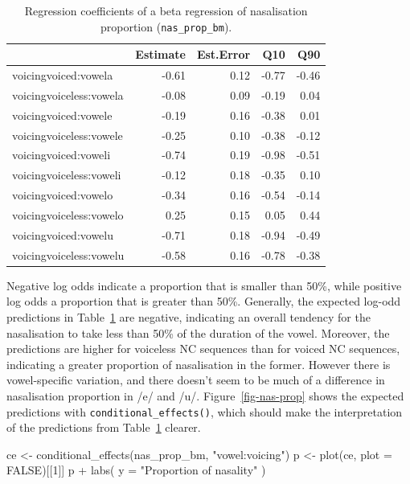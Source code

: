 \documentclass[
  authoryear,
  preprint,
  3p]{elsarticle}
\newenvironment{Shaded}{\begin{snugshade}}{\end{snugshade}}
\newcommand{\AttributeTok}[1]{\textcolor[rgb]{0.40,0.45,0.13}{#1}}
\newcommand{\ConstantTok}[1]{\textcolor[rgb]{0.56,0.35,0.01}{#1}}
\newcommand{\DecValTok}[1]{\textcolor[rgb]{0.68,0.00,0.00}{#1}}
\newcommand{\FunctionTok}[1]{\textcolor[rgb]{0.28,0.35,0.67}{#1}}
\newcommand{\NormalTok}[1]{\textcolor[rgb]{0.00,0.23,0.31}{#1}}
\newcommand{\OtherTok}[1]{\textcolor[rgb]{0.00,0.23,0.31}{#1}}
\newcommand{\SpecialCharTok}[1]{\textcolor[rgb]{0.37,0.37,0.37}{#1}}
\newcommand{\StringTok}[1]{\textcolor[rgb]{0.13,0.47,0.30}{#1}}
\begin{document}
\begin{longtable}[]{@{}lrrrr@{}}

\caption{\label{tbl-nas-prop-fixef}Regression coefficients of a beta
regression of nasalisation proportion (\texttt{nas\_prop\_bm}).}

\tabularnewline

\toprule\noalign{}
& Estimate & Est.Error & Q10 & Q90 \\
\midrule\noalign{}
\endhead
\bottomrule\noalign{}
\endlastfoot
voicingvoiced:vowela & -0.61 & 0.12 & -0.77 & -0.46 \\
voicingvoiceless:vowela & -0.08 & 0.09 & -0.19 & 0.04 \\
voicingvoiced:vowele & -0.19 & 0.16 & -0.38 & 0.01 \\
voicingvoiceless:vowele & -0.25 & 0.10 & -0.38 & -0.12 \\
voicingvoiced:voweli & -0.74 & 0.19 & -0.98 & -0.51 \\
voicingvoiceless:voweli & -0.12 & 0.18 & -0.35 & 0.10 \\
voicingvoiced:vowelo & -0.34 & 0.16 & -0.54 & -0.14 \\
voicingvoiceless:vowelo & 0.25 & 0.15 & 0.05 & 0.44 \\
voicingvoiced:vowelu & -0.71 & 0.18 & -0.94 & -0.49 \\
voicingvoiceless:vowelu & -0.58 & 0.16 & -0.78 & -0.38 \\

\end{longtable}

Negative log odds indicate a proportion that is smaller than 50\%, while
positive log odds a proportion that is greater than 50\%. Generally, the
expected log-odd predictions in Table~\ref{tbl-nas-prop-fixef} are
negative, indicating an overall tendency for the nasalisation to take
less than 50\% of the duration of the vowel. Moreover, the predictions
are higher for voiceless NC sequences than for voiced NC sequences,
indicating a greater proportion of nasalisation in the former. However
there is vowel-specific variation, and there doesn't seem to be much of
a difference in nasalisation proportion in /e/ and /u/.
Figure~\ref{fig-nas-prop} shows the expected predictions with
\texttt{conditional\_effects()}, which should make the interpretation of
the predictions from Table~\ref{tbl-nas-prop-fixef} clearer.

\begin{Shaded}
\begin{Highlighting}[]
\NormalTok{ce }\OtherTok{\textless{}{-}} \FunctionTok{conditional\_effects}\NormalTok{(nas\_prop\_bm, }\StringTok{"vowel:voicing"}\NormalTok{)}
\NormalTok{p }\OtherTok{\textless{}{-}} \FunctionTok{plot}\NormalTok{(ce, }\AttributeTok{plot =} \ConstantTok{FALSE}\NormalTok{)[[}\DecValTok{1}\NormalTok{]]}
\NormalTok{p }\SpecialCharTok{+}
  \FunctionTok{labs}\NormalTok{(}
    \AttributeTok{y =} \StringTok{"Proportion of nasality"}
\NormalTok{  )}
\end{Highlighting}
\end{Shaded}
\end{document}
